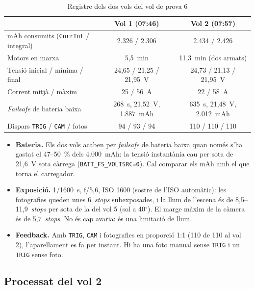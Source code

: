 \begin{table}[H]
    \centering
    \caption{Registre dels dos vols del vol de prova 6}
    \label{tab:vol6-logs}
    \small
    \begin{tabular}{lcc}
        \toprule
        & Vol 1 (07:46) & Vol 2 (07:57) \\
        \midrule
        mAh consumits (\texttt{CurrTot} / integral) & 2.326 / 2.306 & 2.434 / 2.426 \\
        Motors en marxa & 5,5~min & 11,3~min (dos armats) \\
        Tensió inicial / mínima / final & 24,65 / 21,25 / 21,95~V & 24,73 / 21,13 / 21,95~V \\
        Corrent mitjà / màxim & 25 / 56~A & 22 / 58~A \\
        \emph{Failsafe} de bateria baixa & 268~s, 21,52~V, 1.887~mAh & 635~s, 21,48~V, 2.012~mAh \\
        Dispars \texttt{TRIG} / \texttt{CAM} / fotos & 94 / 93 / 94 & 110 / 110 / 110 \\
        \bottomrule
    \end{tabular}
\end{table}

\begin{itemize}
    \item \textbf{Bateria.} Els dos vols acaben per \emph{failsafe} de bateria baixa quan només s'ha gastat el 47--50~\% dels 4.000~mAh: la tensió instantània cau per sota de 21,6~V sota càrrega (\texttt{BATT\_FS\_VOLTSRC=0}). Cal comparar els mAh amb el que torna el carregador.
    \item \textbf{Exposició.} 1/1600~s, f/5,6, ISO 1600 (sostre de l'ISO automàtic): les fotografies queden unes 6~\emph{stops} subexposades, i la llum de l'escena és de 8,5--11,9~\emph{stops} per sota de la del vol 5 (sol a 40$^{\circ}$). El marge màxim de la càmera és de 5,7~\emph{stops}. No és cap avaria: és una limitació de llum.
    \item \textbf{Feedback.} Amb \texttt{TRIG}, \texttt{CAM} i fotografies en proporció 1:1 (110 de 110 al vol 2), l'aparellament es fa per instant. Hi ha una foto manual sense \texttt{TRIG} i un \texttt{TRIG} sense foto.
\end{itemize}


\subsection{Processat del vol 2}

